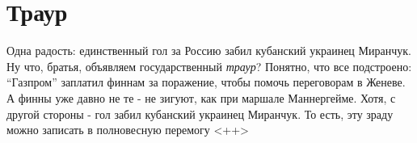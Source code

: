  
 
 
 
 
\chapter{Траур}
\label{sec:slova.traur}

Одна радость: единственный гол за Россию забил кубанский украинец Миранчук.  Ну
что, братья, объявляем государственный \emph{траур}?  Понятно, что все
подстроено: \enquote{Газпром} заплатил финнам за поражение, чтобы помочь
переговорам в Женеве. А финны уже давно не те - не зигуют, как при маршале
Маннергейме.  Хотя, с другой стороны - гол забил кубанский украинец Миранчук.
То есть, эту зраду можно записать в полновесную перемогу
  <++>
